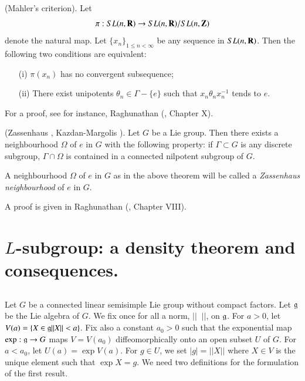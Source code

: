 \begin{romantheorem}{\rm (Mahler's criterion).}\label{art9-romanthm7}
Let 
$$
\pi : S L (n, \mathbf{R}) \to SL (n, \mathbf{R}) / SL (n, \mathbf{Z})
$$
denote the natural map. Let $\{x_n\}_{1 \leq n < \infty}$ be any sequence in $SL (n, \mathbf{R})$. Then the following two conditions are equivalent:
\begin{itemize}
\item[(i)] $\pi (x_n)$ has no convergent subsequence;

\item[(ii)] There exist unipotents $\theta_n \in\Gamma - \{e\}$ such that $x_n \theta_n x^{-1}_n$ tends to $e$.
\end{itemize}
\end{romantheorem}

For a proof, see for instance, Raghunathan (\cite{art9-raghunathan-1}, Chapter X).

\begin{romantheorem}{\rm (Zassenhaus \cite{art9-zassenhaus-1}, Kazdan-Margolis \cite{art9-kazdan-margolis-1}).}\label{art9-romanthm9}
Let $G$ be a Lie group. Then there exists a neighbourhood $\Omega$ of $e$ in $G$ with the following property: if $\Gamma \subset G$ is any discrete subgroup, $\Gamma \cap \Omega$ is contained in a connected nilpotent subgroup of $G$.
\end{romantheorem}

A neighbourhood $\Omega$ of $e$ in $G$ as in the above theorem will be called a \textit{Zassenhaus neighbourhood} of $e$ in $G$.

A proof is given in Raghunathan (\cite{art9-raghunathan-1}, Chapter VIII).

\section{$L$-subgroup: a density theorem and consequences.}\label{art9-sec1}\pageoriginale

\subsection{}\label{art9-subsec1.1}
Let $G$ be a connected linear semisimple Lie group without compact factors. Let $\mathfrak{g}$ be the Lie algebra of $G$. We fix once for all a norm, $||\;\; ||$, on $\mathfrak{g}$. For $a>0$, let $V(a) = \{X \in \mathfrak{g} ||X|| < a \}$. Fix also a constant $a_0>0$ such that the exponential map $\exp : \mathfrak{g} \to G$ maps $V = V(a_0)$ diffeomorphically onto an open subset $U$ of $G$. For $a< a_0$, let $U (a) = \exp V(a)$. For $g \in U$, we set $|g| = ||X||$ where $X \in V$ is the unique element such that $\exp  X = g$. We need two definitions for the formulation of the first result.


